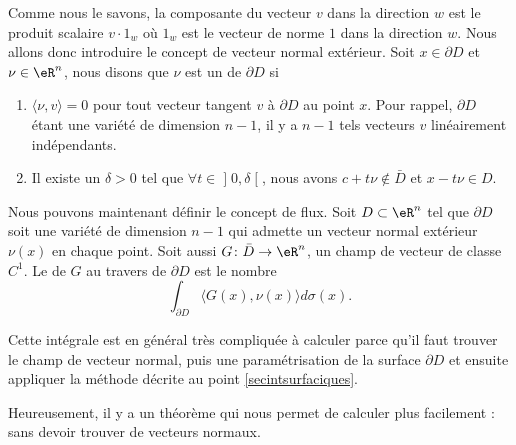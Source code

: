 Comme nous le savons, la composante du vecteur $v$ dans la direction $w$ est le produit scalaire $v\cdot 1_w$ où $1_w$ est le vecteur de norme $1$ dans la direction $w$. Nous allons donc introduire le concept de vecteur normal extérieur. Soit $x\in\partial D$ et $\nu\in\eR^n$, nous disons que $\nu$ est un  de $\partial D$ si
\begin{enumerate}

	\item
		$\langle \nu, v\rangle =0$ pour tout vecteur tangent $v$ à $\partial D$ au point $x$. Pour rappel, $\partial D$ étant une variété de dimension $n-1$, il y a $n-1$ tels vecteurs $v$ linéairement indépendants.
	
	\item
		Il existe un $\delta>0$ tel que $\forall t\in\mathopen] 0 , \delta \mathclose[$, nous avons $c+t\nu\notin \bar D$ et $x-t\nu\in D$.
 
\end{enumerate}

Nous pouvons maintenant définir le concept de flux. Soit $D\subset \eR^n$ tel que $\partial D$ soit une variété de dimension $n-1$ qui admette un vecteur normal extérieur $\nu(x)$ en chaque point. Soit aussi $G\colon \bar D\to \eR^n$, un champ de vecteur de classe $C^1$. Le  de $G$ au travers de $\partial D$ est le nombre
\begin{equation}
	\int_{\partial D}\langle G(x), \nu(x)\rangle d\sigma(x).
\end{equation}

Cette intégrale est en général très compliquée à calculer parce qu'il faut trouver le champ de vecteur normal, puis une paramétrisation de la surface $\partial D$ et ensuite appliquer la méthode décrite au point \ref{secintsurfaciques}. 

Heureusement, il y a un théorème qui nous permet de calculer plus facilement : sans devoir trouver de vecteurs normaux.

